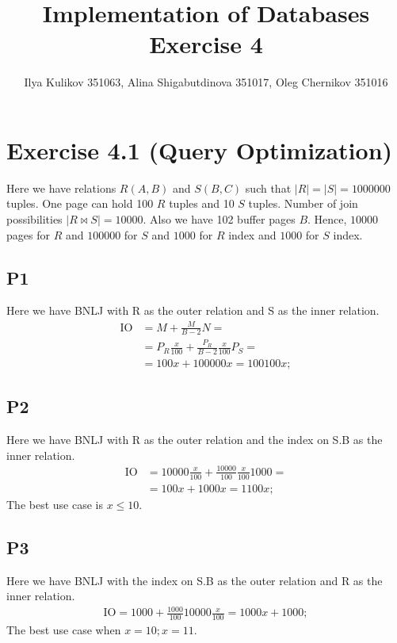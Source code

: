 \documentclass[10pt]{article}
\title{Implementation of Databases Exercise 4}
\author{Ilya Kulikov 351063, Alina Shigabutdinova 351017, Oleg Chernikov 351016}
\begin{document}
  \maketitle

  \section*{Exercise 4.1 (Query Optimization)}
  Here we have relations $R(A,B)$ and $S(B,C)$ such that $|R|=|S| = 1000000$ tuples.
  One page can hold 100 $R$ tuples and 10 $S$ tuples. Number of join possibilities
  $|R \bowtie S| = 10000$. Also we have 102 buffer pages $B$. Hence, $10000$ pages
  for $R$ and $100000$ for $S$ and $1000$ for $R$ index and $1000$ for $S$ index.\\
  \subsection*{P1}
  Here we have BNLJ with R as the outer relation and S as the inner relation.\\
  \begin{align*}
    \text{IO} &= M + \frac{M}{B-2} N =\\
    &= P_R \frac{x}{100} + \frac{P_R}{B-2} \frac{x}{100} P_S =\\
    &= 100x + 100000x = 100100x;
  \end{align*}
  \subsection*{P2}
  Here we have BNLJ with R as the outer relation and the index on S.B as the inner relation.\\
  \begin{align*}
    \text{IO} &= 10000 \frac{x}{100} + \frac{10000}{100} \frac{x}{100} 1000=\\
    &=100x + 1000x = 1100x;
  \end{align*}
  The best use case is $x \leq 10$.
  \subsection*{P3}
  Here we have BNLJ with the index on S.B as the outer relation and R as the inner relation.\\
  \begin{align*}
    \text{IO} = 1000+\frac{1000}{100}10000\frac{x}{100} = 1000x + 1000;
  \end{align*}
  The best use case when $x = 10; x = 11$.
\end{document}
